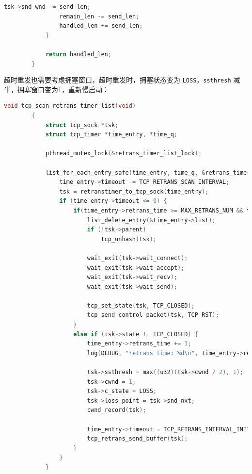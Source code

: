\documentclass[UTF8]{report}
\begin{document}
\begin{enumerate}
\begin{lstlisting}[language=C]
                tsk->snd_wnd -= send_len;
                remain_len -= send_len;
                handled_len += send_len;
            }
        
            return handled_len;
        }
    \end{lstlisting}
    
    超时重发也需要考虑拥塞窗口，超时重发时，拥塞状态变为 \texttt{LOSS}，\texttt{ssthresh} 减半，拥塞窗口变为1，重新慢启动：

    \begin{lstlisting}[language=C]
        void tcp_scan_retrans_timer_list(void)
        {
            struct tcp_sock *tsk;
            struct tcp_timer *time_entry, *time_q;
        
            pthread_mutex_lock(&retrans_timer_list_lock);
            
            list_for_each_entry_safe(time_entry, time_q, &retrans_timer_list, list) {
                time_entry->timeout -= TCP_RETRANS_SCAN_INTERVAL;
                tsk = retranstimer_to_tcp_sock(time_entry);
                if (time_entry->timeout <= 0) {
                    if(time_entry->retrans_time >= MAX_RETRANS_NUM && tsk->state != TCP_CLOSED){
                        list_delete_entry(&time_entry->list);
                        if (!tsk->parent)
                            tcp_unhash(tsk);
                            
                        wait_exit(tsk->wait_connect);
                        wait_exit(tsk->wait_accept);
                        wait_exit(tsk->wait_recv);
                        wait_exit(tsk->wait_send);
                        
                        tcp_set_state(tsk, TCP_CLOSED);
                        tcp_send_control_packet(tsk, TCP_RST);
                    }
                    else if (tsk->state != TCP_CLOSED) {
                        time_entry->retrans_time += 1;
                        log(DEBUG, "retrans time: %d\n", time_entry->retrans_time);
        
                        tsk->ssthresh = max((u32)(tsk->cwnd / 2), 1);
                        tsk->cwnd = 1;
                        tsk->c_state = LOSS;
                        tsk->loss_point = tsk->snd_nxt;
                        cwnd_record(tsk);
                        
                        time_entry->timeout = TCP_RETRANS_INTERVAL_INITIAL;
                        tcp_retrans_send_buffer(tsk);
                    }
                }
            }
        

\end{lstlisting}
\end{enumerate}
\end{document}

